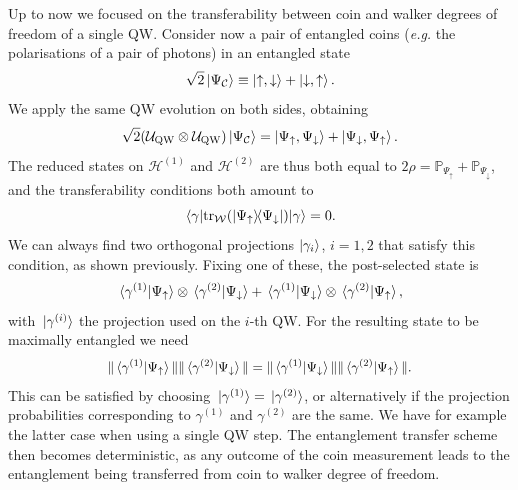 \documentclass[
	aps, pra,
	superscriptaddress, twocolumn,
	floatfix,
	10pt
]{revtex4-1}
\newcommand{\on}[1]{\operatorname{#1}}
\newcommand{\parTitle}[1]{\noindent{\color{Mahogany}(\emph{#1})}}
\newcommand{\PP}{\mathbb{P}}
\newcommand{\calC}{{\mathcal{C}}}
\newcommand{\calH}{{\mathcal{H}}}
\newcommand{\calU}{{\mathcal{U}}}
\newcommand{\calW}{{\mathcal{W}}}
\begin{document}
\parTitle{Pair of QWs}
Up to now we focused on the transferability between coin and walker degrees of freedom of a single QW.
Consider now a pair of entangled coins (\emph{e.g.} the polarisations of a pair of photons) in an entangled state
\begin{equation}
	\sqrt2\ket{\Psi_{\calC}}\equiv \ket{\uparrow,\downarrow} + \ket{\downarrow,\uparrow}.
\end{equation}
We apply the same QW evolution on both sides, obtaining
\begin{equation}
	\sqrt2(\calU_{\on{QW}}\otimes \calU_{\on{QW}}) \ket{\Psi_{\calC}} =
	\ket{\Psi_\uparrow,\Psi_\downarrow} +
	\ket{\Psi_\downarrow,\Psi_\uparrow}.
\end{equation}
The reduced states on $\calH^{(1)}$ and $\calH^{(2)}$ are thus both equal to
	$2\rho = \PP_{\Psi_\uparrow} + \PP_{\Psi_\downarrow}$,
and the transferability conditions both amount to
\begin{equation}
	\mel{\gamma}{\tr_{\calW}(\ketbra{\Psi_\uparrow}{\Psi_\downarrow})}{\gamma} = 0.
\end{equation}
We can always find two orthogonal projections $\ket{\gamma_i}$, $i=1,2$ that satisfy this condition, as shown previously.
Fixing one of these, the post-selected state is
\begin{equation}
	\braket*{\gamma^{(1)}}{\Psi_\uparrow}\otimes \braket*{\gamma^{(2)}}{\Psi_\downarrow}
	+
	\braket*{\gamma^{(1)}}{\Psi_\downarrow}\otimes \braket*{\gamma^{(2)}}{\Psi_\uparrow},
\end{equation}
with $\ket*{\gamma^{(i)}}$ the projection used on the $i$-th QW.
For the resulting state to be maximally entangled we need
\begin{equation}\scalebox{0.96}{$\displaystyle
	\|\braket*{\gamma^{(1)}}{\Psi_\uparrow}\|
	\|\braket*{\gamma^{(2)}}{\Psi_\downarrow}\|
	=
	\|\braket*{\gamma^{(1)}}{\Psi_\downarrow}\|
	\|\braket*{\gamma^{(2)}}{\Psi_\uparrow}\|.
$}\end{equation}
This can be satisfied by choosing $\ket*{\gamma^{(1)}}=\ket*{\gamma^{(2)}}$, or alternatively if the projection probabilities corresponding to $\gamma^{(1)}$ and $\gamma^{(2)}$ are the same.
We have for example the latter case when using a single QW step.
The entanglement transfer scheme then becomes deterministic, as any outcome of the coin measurement leads to the entanglement being transferred from coin to walker degree of freedom.
\end{document}
